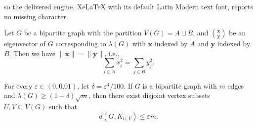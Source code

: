 \documentclass[10pt,a4paper]{amsart}
\begin{document}
so the delivered engine, XeLaTeX with its default Latin Modern text font, reports no missing character.
\begin{lemma} \label{lem-square-equal}
  Let $G$ be a bipartite graph with the partition $V(G)=A\sqcup B$, and $\binom{\bm{x}}{ \bm{y}}$ be an eigenvector of $G$ corresponding to $\lambda (G)$ with $\bm{x}$ indexed by $A$ and $\bm{y}$ indexed by $B$. Then we have $\lVert \bm{x}\rVert = \lVert \bm{y}\rVert$, i.e., 
  \[ \sum_{i\in A} x_i^2 = \sum_{j\in B} y_j^2. \]  
\end{lemma}

\begin{lemma}
\label{lem:close-to-Kab}
For every $\varepsilon \in (0,0.01)$, 
let $\delta = \varepsilon^4/100$. 
If $G$ is a bipartite graph with 
$m$ edges and $\lambda (G) \ge 
(1- \delta ) \sqrt{m}$, then there exist disjoint vertex subsets $U, V\subseteq V(G)$ such that 
\[ d(G, K_{U, V}) \leq \varepsilon m. \]  
\end{lemma}
\end{document}
